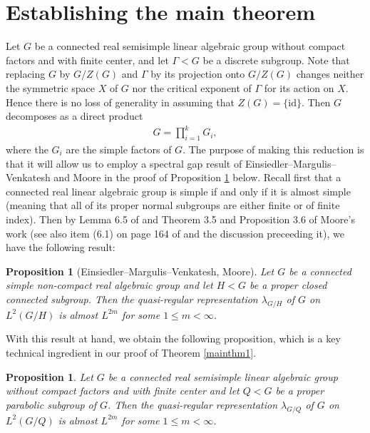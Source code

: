 \documentclass[psamsfonts]{amsart}
\newtheorem{prop}[thm]{Proposition}
\theoremstyle{definition}
\theoremstyle{remark}
\numberwithin{equation}{section}
\begin{document}
\section{Establishing the main theorem}
\label{establishingmainthm}
Let $G$ be a connected real semisimple linear algebraic group without compact factors and with finite center, and let $\Gamma < G$ be a discrete subgroup. Note that replacing $G$ by $G/Z(G)$ and $\Gamma$ by its projection onto $G/Z(G)$ changes neither the symmetric space $X$ of $G$ nor the critical exponent of $\Gamma$ for its action on $X$. Hence there is no loss of generality in assuming that $Z(G) = \{\mathrm{id}\}$. Then $G$ decomposes as a direct product
\begin{align*}
G = \prod_{i=1}^{k} G_{i},
\end{align*} where the $G_{i}$ are the simple factors of $G$. The purpose of making this reduction is that it will allow us to employ a spectral gap result of Einsiedler--Margulis--Venkatesh \cite{EMV} and Moore \cite{Mo} in the proof of Proposition \ref{semisimplealmostL2m} below. Recall first that a connected real linear algebraic group is simple if and only if it is almost simple (meaning that all of its proper normal subgroups are either finite or of finite index). Then by Lemma 6.5 of \cite{EMV} and Theorem 3.5 and Proposition 3.6 of Moore's work \cite{Mo} (see also item (6.1) on page 164 of \cite{EMV} and the discussion preceeding it), we have the following result:
\begin{prop} [Einsiedler--Margulis--Venkatesh, Moore]
\label{simplealmostL2m}
Let $G$ be a connected simple non-compact real algebraic group and let $H < G$ be a proper closed connected subgroup. Then the quasi-regular representation $\lambda_{G/H}$ of $G$ on $L^2(G/H)$ is almost $L^{2m}$ for some $1 \leq m < \infty$.
\end{prop}
With this result at hand, we obtain the following proposition, which is a key technical ingredient in our proof of Theorem \ref{mainthm1}.
\begin{prop}
\label{semisimplealmostL2m}
Let $G$ be a connected real semisimple linear algebraic group without compact factors and with finite center and let $Q < G$ be a proper parabolic subgroup of $G$. Then the quasi-regular representation $\lambda_{G/Q}$ of $G$ on $L^2(G/Q)$ is almost $L^{2m}$ for some $1 \leq m < \infty$.
\end{prop}
\end{document}
